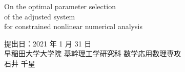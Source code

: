 \begin{titlepage}
  \begin{center}
    {\Huge On the optimal parameter selection\\of the adjusted system\\\vspace{10truept}for constrained nonlinear numerical analysis}

      \vspace*{180truept}
      \vspace{160truept}
      \vspace{10truept}
      \vspace{70truept}
      {\Large 提出日：2021 年 1 月 31 日}\\
      \vspace{30truept} 
      {\Large 早稲田大学大学院}
      \vspace{10truept}
      {\Large 基幹理工学研究科 数学応用数理専攻}\\
      \vspace{20truept}
      {\Large 石井 千星}      
  \end{center}
\end{titlepage}